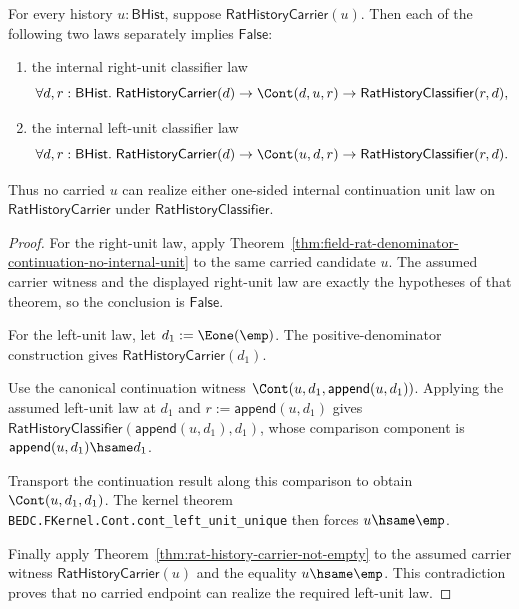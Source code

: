 \begin{theorem}
\label{thm:field-rat-denominator-continuation-no-one-sided-internal-unit}
For every history $u:\mathsf{BHist}$, suppose
$\mathsf{RatHistoryCarrier}(u)$. Then each of the following two laws separately
implies $\mathsf{False}$:
\begin{enumerate}
\item the internal right-unit classifier law
$$
\forall d,r:\mathsf{BHist}.\;
\mathsf{RatHistoryCarrier}(d)\to
\Cont(d,u,r)\to
\mathsf{RatHistoryClassifier}(r,d),
$$
\item the internal left-unit classifier law
$$
\forall d,r:\mathsf{BHist}.\;
\mathsf{RatHistoryCarrier}(d)\to
\Cont(u,d,r)\to
\mathsf{RatHistoryClassifier}(r,d).
$$
\end{enumerate}
Thus no carried $u$ can realize either one-sided internal continuation unit law
on $\mathsf{RatHistoryCarrier}$ under $\mathsf{RatHistoryClassifier}$.
\end{theorem}
\begin{proof}
For the right-unit law, apply
Theorem~\ref{thm:field-rat-denominator-continuation-no-internal-unit} to the
same carried candidate $u$. The assumed carrier witness and the displayed
right-unit law are exactly the hypotheses of that theorem, so the conclusion is
$\mathsf{False}$.

For the left-unit law, let $d_1:=\Eone(\emp)$. The positive-denominator
construction gives $\mathsf{RatHistoryCarrier}(d_1)$.

Use the canonical continuation witness
$\Cont(u,d_1,\mathsf{append}(u,d_1))$. Applying the assumed left-unit law at
$d_1$ and $r:=\mathsf{append}(u,d_1)$ gives
$\mathsf{RatHistoryClassifier}(\mathsf{append}(u,d_1),d_1)$, whose comparison
component is $\mathsf{append}(u,d_1)\hsame d_1$.

Transport the continuation result along this comparison to obtain
$\Cont(u,d_1,d_1)$. The kernel theorem
\texttt{BEDC.FKernel.Cont.cont\_left\_unit\_unique} then forces
$u\hsame\emp$.

Finally apply Theorem~\ref{thm:rat-history-carrier-not-empty} to the assumed
carrier witness $\mathsf{RatHistoryCarrier}(u)$ and the equality
$u\hsame\emp$. This contradiction proves that no carried endpoint can realize
the required left-unit law.
\end{proof}

